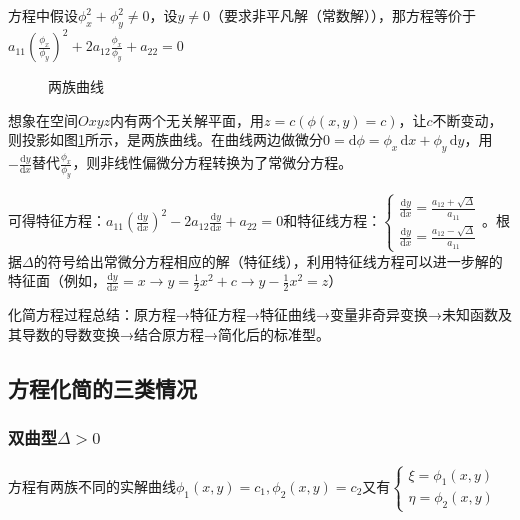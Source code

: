 方程中假设\(\phi_x^2+\phi_y^2\neq0\)，设\(y\neq0\)（要求非平凡解（常数解）），那方程等价于\(a_{11}\left(\frac{\phi_x}{\phi_y}\right)^2+2a_{12}\frac{\phi_x}{\phi_y}+a_{22}=0\)

\begin{figure}
	\centering
	\caption{两族曲线}\label{pic:2}
\end{figure}

想象在空间\(Oxyz\)内有两个无关解平面，用\(z=c(\phi(x,y)=c)\)，让\(c\)不断变动，则投影如图\ref{pic:2}所示，是两族曲线。在曲线两边做微分\(0=\mathrm{d}\phi=\phi_x\,\mathrm{d}x+\phi_y\,\mathrm{d}y\)，用\(-\frac{\mathrm{d}y}{\mathrm{d}x}\)替代\(\frac{\phi_x}{\phi_y}\)，则非线性偏微分方程转换为了常微分方程。

可得特征方程：\(a_{11}\left(\frac{\mathrm{d}y}{\mathrm{d}x}\right)^2-2a_{12}\frac{\mathrm{d}y}{\mathrm{d}x}+a_{22}=0\)和特征线方程：\(\begin{cases}\frac{\mathrm{d}y}{\mathrm{d}x}=\frac{a_{12}+\sqrt\Delta}{a_{11}}\\\frac{\mathrm{d}y}{\mathrm{d}x}=\frac{a_{12}-\sqrt\Delta}{a_{11}}\end{cases}\)。根据\(\Delta\)的符号给出常微分方程相应的解（特征线），利用特征线方程可以进一步解的特征面（例如，\(\frac{\mathrm{d}y}{\mathrm{d}x}=x\rightarrow y=\frac{1}{2}x^2+c\rightarrow y-\frac{1}{2}x^2=z\)）

化简方程过程总结：原方程→特征方程→特征曲线→变量非奇异变换→未知函数及其导数的导数变换→结合原方程→简化后的标准型。

\subsection{方程化简的三类情况}

\subsubsection{双曲型\(\Delta>0\)}

方程有两族不同的实解曲线\(\phi_1(x,y)=c_1,\phi_2(x,y)=c_2\)又有\(\begin{cases}\xi=\phi_1(x,y)\\\eta=\phi_2(x,y)\end{cases}\)

